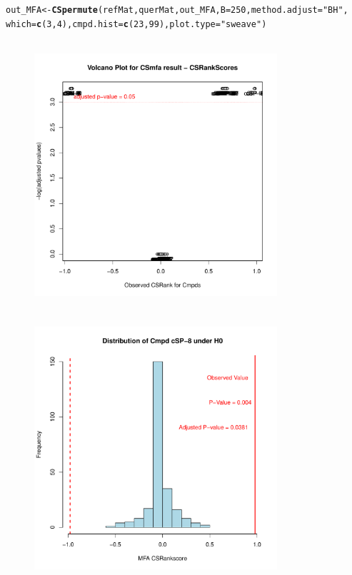 \documentclass[a4paper]{article}\usepackage[]{graphicx}\usepackage[]{color}
\makeatletter
\newcommand{\hlnum}[1]{\textcolor[rgb]{0.686,0.059,0.569}{#1}}%
\newcommand{\hlstr}[1]{\textcolor[rgb]{0.192,0.494,0.8}{#1}}%
\newcommand{\hlstd}[1]{\textcolor[rgb]{0.345,0.345,0.345}{#1}}%
\newcommand{\hlkwb}[1]{\textcolor[rgb]{0.69,0.353,0.396}{#1}}%
\newcommand{\hlkwc}[1]{\textcolor[rgb]{0.333,0.667,0.333}{#1}}%
\newcommand{\hlkwd}[1]{\textcolor[rgb]{0.737,0.353,0.396}{\textbf{#1}}}%
\newenvironment{kframe}{%
 \def\at@end@of@kframe{}%
 \ifinner\ifhmode%
  \def\at@end@of@kframe{\end{minipage}}%
  \begin{minipage}{\columnwidth}%
 \fi\fi%
 \def\FrameCommand##1{\hskip\@totalleftmargin \hskip-\fboxsep
 \colorbox{shadecolor}{##1}\hskip-\fboxsep
     \hskip-\linewidth \hskip-\@totalleftmargin \hskip\columnwidth}%
 \MakeFramed {\advance\hsize-\width
   \@totalleftmargin\z@ \linewidth\hsize
   \@setminipage}}%
 {\par\unskip\endMakeFramed%
 \at@end@of@kframe}
\newenvironment{knitrout}{}{} %
\makeatother
\begin{document}
\begin{knitrout}
\color{fgcolor}\begin{kframe}
\begin{alltt}
\hlstd{out_MFA} \hlkwb{<-} \hlkwd{CSpermute}\hlstd{(refMat,querMat,out_MFA,}\hlkwc{B}\hlstd{=}\hlnum{250}\hlstd{,}\hlkwc{method.adjust}\hlstd{=}\hlstr{"BH"}\hlstd{,}
                \hlkwc{which}\hlstd{=}\hlkwd{c}\hlstd{(}\hlnum{3}\hlstd{,}\hlnum{4}\hlstd{),}\hlkwc{cmpd.hist}\hlstd{=}\hlkwd{c}\hlstd{(}\hlnum{23}\hlstd{,}\hlnum{99}\hlstd{),}\hlkwc{plot.type}\hlstd{=}\hlstr{"sweave"}\hlstd{)}
\end{alltt}
\end{kframe}\begin{figure}[H]


\includegraphics[width=9cm,height=10cm]{figure/CSpermuteplots2-1} 
\includegraphics[width=9cm,height=10cm]{figure/CSpermuteplots2-2} 

\end{figure}
\end{knitrout}
\end{document}
